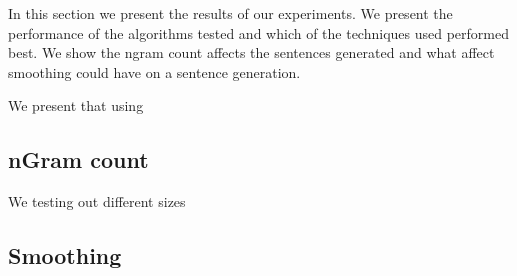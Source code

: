 \documentclass[ai15_group61_report.tex]{subfiles}
\begin{document}
In this section we present the results of our experiments. We present the performance of the algorithms tested and which of the techniques used performed best. We show the ngram count affects the sentences generated and what affect smoothing could have on a sentence generation.

We present that using

\subsection{nGram count}
We testing out different sizes 

\subsection{Smoothing}
\end{document}
